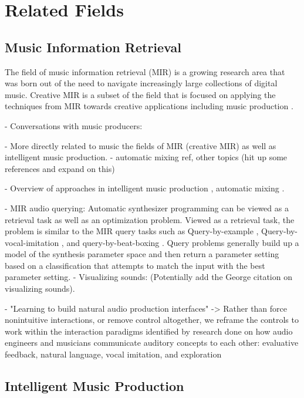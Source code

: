 \section{Related Fields}
\subsection{Music Information Retrieval}
The field of music information retrieval (MIR) is a growing research area that was born out of the need to navigate increasingly large collections of digital music. Creative MIR is a subset of the field that is focused on applying the techniques from MIR towards creative applications including music production \cite{humphrey2013brief}.

- Conversations with music producers: \cite{andersen2016conversations}

- More directly related to music the fields of MIR (creative MIR) as well as intelligent music production. - automatic mixing ref, other topics (hit up some references and expand on this)

- Overview of approaches in intelligent music production \cite{moffat2019approaches}, automatic mixing \cite{de2017ten}.

- MIR audio querying: Automatic synthesizer programming can be viewed as a retrieval task as well as an optimization problem. Viewed as a retrieval task, the problem is similar to the MIR query tasks such as Query-by-example \cite{zloof1977query}, Query-by-vocal-imitation \cite{blancas2014sound}, and query-by-beat-boxing \cite{kapur2004query}. Query problems generally build up a model of the synthesis parameter space and then return a parameter setting based on a classification that attempts to match the input with the best parameter setting.
- Visualizing sounds: \cite{wessel1979timbre} (Potentially add the George citation on visualizing sounds).

- \cite{pardo2019learning} "Learning to build natural audio production interfaces" -> Rather than force nonintuitive interactions, or remove control altogether, we reframe the controls to work within the interaction paradigms identified by research done on how audio engineers and musicians communicate auditory concepts to each other: evaluative feedback, natural language, vocal imitation, and exploration
\subsection{Intelligent Music Production}

